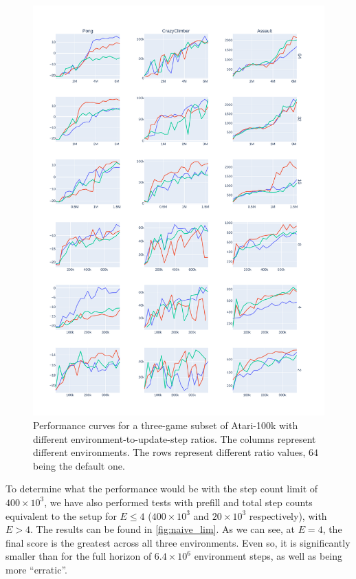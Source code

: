 \documentclass[twoside,11pt]{article}
\begin{document}
\begin{figure}
  \centering
  \includegraphics[width=0.8\linewidth,height=0.8\paperheight,keepaspectratio]{assets/naive_perf.pdf}
  \caption{Performance curves for a three-game subset of Atari-100k with different environment-to-update-step ratios. The columns represent different environments. The rows represent different ratio values, $64$ being the default one.}
  \label{fig:naive_perf}
\end{figure}

To determine what the performance would be with the step count limit of $400 \times 10^3$, we have also performed tests with prefill and total step counts equivalent to the setup for $E \leq 4$ ($400 \times 10^3$ and $20 \times 10^3$ respectively), with $E > 4$. The results can be found in \autoref{fig:naive_lim}. As we can see, at $E = 4$, the final score is the greatest across all three environments. Even so, it is significantly smaller than for the full horizon of $6.4 \times 10^6$ environment steps, as well as being more ``erratic''.
\end{document}
